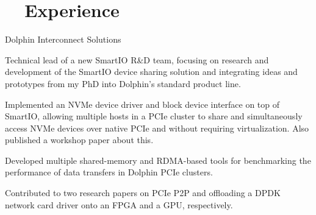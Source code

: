 \section[Experience]{\faBriefcase~~Experience}
\begin{experience}{Dolphin Interconnect Solutions}{
}
    \item{Technical lead of a new SmartIO R\&D team, focusing on research and development of the SmartIO device sharing solution and integrating ideas and prototypes from my PhD into Dolphin's standard product line.}
    \item{Implemented an NVMe device driver and block device interface on top of SmartIO, allowing multiple hosts in a PCIe cluster to share and simultaneously access NVMe devices over native PCIe and without requiring virtualization. Also published a workshop paper about this.} %
    \item{Developed multiple shared-memory and RDMA-based tools for benchmarking the performance of data transfers in Dolphin PCIe clusters.}
    \item{Contributed to two research papers on PCIe P2P and offloading a DPDK network card driver onto an FPGA and a GPU, respectively.}
\end{experience}

